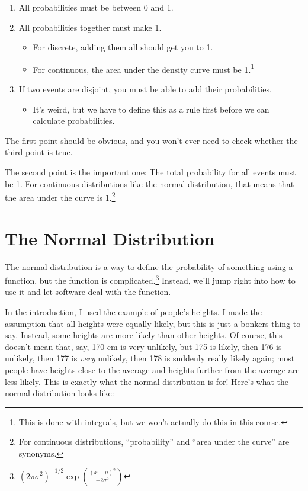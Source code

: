 \documentclass[
  letterpaper,
  DIV=11,
  numbers=noendperiod]{scrreprt}
\providecommand{\tightlist}{%
  \setlength{\itemsep}{0pt}\setlength{\parskip}{0pt}}\usepackage{longtable,booktabs,array}
\begin{document}
\begin{enumerate}
\def\labelenumi{\arabic{enumi}.}
\tightlist
\item
  All probabilities must be between 0 and 1.
\item
  All probabilities together must make 1.

  \begin{itemize}
  \tightlist
  \item
    For discrete, adding them all should get you to 1.
  \item
    For continuous, the area under the density curve must be
    1.\footnote{This is done with integrals, but we won't actually do
      this in this course.}
  \end{itemize}
\item
  If two events are disjoint, you must be able to add their
  probabilities.

  \begin{itemize}
  \tightlist
  \item
    It's weird, but we have to define this as a rule first before we can
    calculate probabilities.
  \end{itemize}
\end{enumerate}

The first point should be obvious, and you won't ever need to check
whether the third point is true.

The second point is the important one: The total probability for all
events must be 1. For continuous distributions like the normal
distribution, that means that the area under the curve is 1.\footnote{For
  continuous distributions, ``probability'' and ``area under the curve''
  are synonyms.}

\hypertarget{the-normal-distribution}{%
\section{The Normal Distribution}\label{the-normal-distribution}}

The normal distribution is a way to define the probability of something
using a function, but the function is complicated.\footnote{\((2\pi\sigma^2)^{-1/2}\exp\left(\frac{(x-\mu)^2}{-2\sigma^2}\right)\)}
Instead, we'll jump right into how to use it and let software deal with
the function.

In the introduction, I used the example of people's heights. I made the
assumption that all heights were equally likely, but this is just a
bonkers thing to say. Instead, some heights are more likely than other
heights. Of course, this doesn't mean that, say, 170 cm is very
unlikely, but 175 is likely, then 176 is unlikely, then 177 is
\emph{very} unlikely, then 178 is suddenly really likely again; most
people have heights close to the average and heights further from the
average are less likely. This is exactly what the normal distribution is
for! Here's what the normal distribution looks like:
\end{document}
